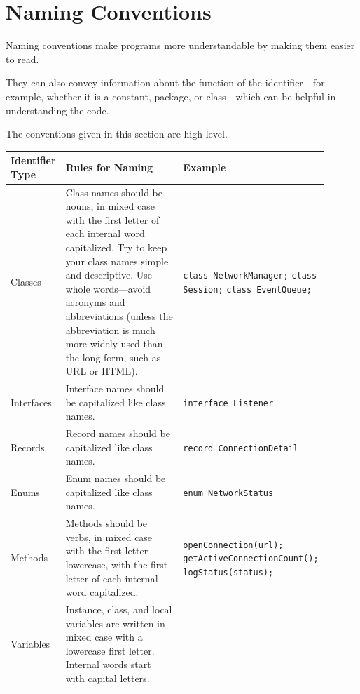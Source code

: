 \documentclass{article}
\begin{document}
\section{Naming Conventions}

Naming conventions make programs more understandable by making them easier to read.

They can also convey information about the function of the identifier---for example, whether it is a
constant, package, or class---which can be helpful in understanding the code.

The conventions given in this section are high-level.

\begingroup
\renewcommand{\arraystretch}{1.5}
\begin{longtable}{
  >{\raggedright\arraybackslash}p{0.125\linewidth}|
  >{\raggedright\arraybackslash}p{0.4\linewidth}
  >{\raggedright\arraybackslash}p{0.375\linewidth}}
\hline
Identifier Type & Rules for Naming & Example \\
\hline
\endhead
\hline
\endlastfoot
%
Classes & Class names should be nouns, in mixed case with the first letter of each internal word
  capitalized. Try to keep your class names simple and descriptive. Use whole words—avoid acronyms
  and abbreviations (unless the abbreviation is much more widely used than the long form, such as
  URL or HTML). &
  \lstinline`class NetworkManager;` \newline
  \lstinline`class Session;` \newline
  \lstinline`class EventQueue;` \\
%
Interfaces & Interface names should be capitalized like class names. &
  \lstinline`interface Listener` \\
%
Records & Record names should be capitalized like class names. &
   \lstinline`record ConnectionDetail` \\
%
Enums & Enum names should be capitalized like class names. &
   \lstinline`enum NetworkStatus` \\
%
Methods & Methods should be verbs, in mixed case with the first letter lowercase, with the first
  letter of each internal word capitalized. &
  \lstinline`openConnection(url);` \newline
  \lstinline`getActiveConnectionCount();` \newline
  \lstinline`logStatus(status);` \\
%
Variables & Instance, class, and local variables are written in mixed case with a lowercase first
  letter. Internal words start with capital letters.
  \par\vspace{0.25\baselineskip plus 2pt}

\end{longtable}
\end{document}
